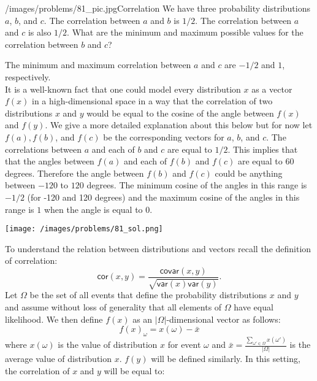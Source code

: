 \begin{problem}{/images/problems/81_pic.jpg}{Correlation} We have three probability distributions $a$, $b$, and $c$. The correlation between $a$ and $b$ is $1/2$. The correlation between $a$ and $c$ is also $1/2$. What are the minimum and maximum possible values for the correlation between $b$ and $c$?
\end{problem}

\begin{solution}
The minimum and maximum correlation between $a$ and $c$ are $-1/2$ and $1$, respectively.\\[0.2cm]

It is a well-known fact that one could model every distribution $x$ as a vector $f(x)$ in a high-dimensional space in a way that the correlation of two distributions $x$ and $y$ would be equal to the cosine of the angle between $f(x)$ and $f(y)$. We give a more detailed explanation about this below but for now let $f(a), f(b)$, and $f(c)$ be the corresponding vectors for $a$, $b$, and $c$. The correlations between $a$ and each of $b$ and $c$ are equal to $1/2$. This implies that that the angles between $f(a)$ and each of $f(b)$ and $f(c)$ are equal to 60 degrees. Therefore the angle between $f(b)$ and $f(c)$ could be anything between $-120$ to $120$ degrees. The minimum cosine of the angles in this range is $-1/2$ (for -120 and 120 degrees) and the maximum cosine of the angles in this range is $1$ when the angle is equal to 0.

\begin{center}
	\texttt{[image: /images/problems/81\_sol.png]}
\end{center}

To understand the relation between distributions and vectors recall the definition of correlation: $$\textsf{cor}(x,y) = \frac{\mathsf{covar}(x,y)}{\sqrt{\mathsf{var}(x)\mathsf{var}(y)}}.$$
Let $\Omega$ be the set of all events that define the probability distributions $x$ and $y$ and assume without loss of generality that all elements of $\Omega$ have equal likelihood. We then define $f(x)$ as an $|\Omega|$-dimensional vector as follows:
$$f(x)_{\omega} = x(\omega) - \bar{x}$$ where $x(\omega)$ is the value of distribution $x$ for event $\omega$ and $\bar{x} = \frac{\sum_{\omega' \in \Omega} x(\omega')}{|\Omega|}$ is the average value of distribution $x$. $f(y)$ will be defined similarly. In this setting, the correlation of $x$ and $y$ will be equal to:


\end{solution}
